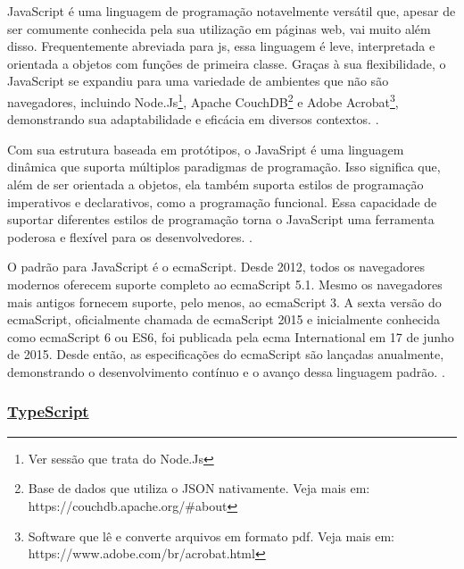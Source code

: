JavaScript é uma linguagem de programação notavelmente versátil que, apesar de ser
comumente conhecida pela sua utilização em páginas
\acrshort{web}, vai muito além disso.
Frequentemente abreviada para 
\acrshort{js}, essa linguagem é leve, interpretada e orientada a objetos
com funções de primeira classe. Graças à sua flexibilidade, o JavaScript se expandiu para uma
variedade de ambientes que não são navegadores, incluindo
Node.Js\footnote{Ver sessão que trata do Node.Js
},
Apache CouchDB\footnote{Base de dados que utiliza o JSON nativamente. Veja mais em:  \\ https://couchdb.apache.org/\#about
}
e
Adobe Acrobat\footnote{Software que lê e converte arquivos em formato
    \acrshort{pdf}. Veja mais em:  \\ https://www.adobe.com/br/acrobat.html
},
demonstrando sua adaptabilidade e eficácia em diversos contextos.
\cite{mdn-js}.

Com sua estrutura baseada em protótipos, o JavaSript é uma linguagem dinâmica que
suporta múltiplos paradigmas de programação. Isso significa que, além de ser orientada a
objetos, ela também suporta estilos de programação imperativos e declarativos, como a
programação funcional. Essa capacidade de suportar diferentes estilos de programação torna o
JavaScript uma ferramenta poderosa e flexível para os desenvolvedores.
\cite{mdn-js}.

O padrão para JavaScript é o
\acrshort{ecma}Script.
Desde 2012, todos os navegadores
modernos oferecem suporte completo ao
\acrshort{ecma}Script 5.1. Mesmo os navegadores mais
antigos fornecem suporte, pelo menos, ao
\acrshort{ecma}Script 3. A sexta versão do
\acrshort{ecma}Script,
oficialmente chamada de
\acrshort{ecma}Script 2015 e inicialmente conhecida como
\acrshort{ecma}Script 6
ou ES6, foi publicada pela \acrshort{ecma} International
em 17 de junho de 2015. Desde então, as
especificações do
\acrshort{ecma}Script são lançadas anualmente, demonstrando o desenvolvimento
contínuo e o avanço dessa linguagem padrão.
\cite{mdn-js}.

\subsubsection{\underline{TypeScript}}

